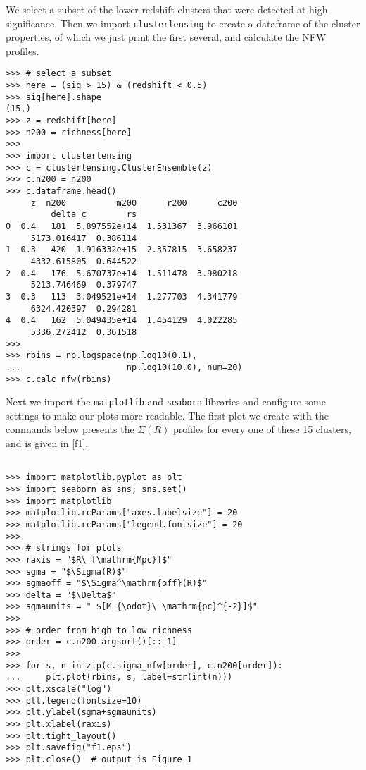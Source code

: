 \documentclass[twocolumn]{aastex6}
\newcommand{\code}{\lstinline[style=codeintext]}
\begin{document}
We select a subset of the lower redshift clusters that were detected at high significance. Then we import \code{clusterlensing} to create a dataframe of the cluster properties, of which we just print the first several, and calculate the NFW profiles.

\begin{verbatim}
>>> # select a subset
>>> here = (sig > 15) & (redshift < 0.5)
>>> sig[here].shape
(15,)
>>> z = redshift[here]
>>> n200 = richness[here]
>>> 
>>> import clusterlensing
>>> c = clusterlensing.ClusterEnsemble(z)
>>> c.n200 = n200
>>> c.dataframe.head()
     z  n200          m200      r200      c200
         delta_c        rs
0  0.4   181  5.897552e+14  1.531367  3.966101
     5173.016417  0.386114
1  0.3   420  1.916332e+15  2.357815  3.658237
     4332.615805  0.644522
2  0.4   176  5.670737e+14  1.511478  3.980218
     5213.746469  0.379747
3  0.3   113  3.049521e+14  1.277703  4.341779
     6324.420397  0.294281
4  0.4   162  5.049435e+14  1.454129  4.022285
     5336.272412  0.361518
>>>
>>> rbins = np.logspace(np.log10(0.1),
...                     np.log10(10.0), num=20)
>>> c.calc_nfw(rbins)
\end{verbatim}
\label{3dmf2df}

Next we import the \code{matplotlib} and \code{seaborn} libraries and configure some settings to make our plots more readable. The first plot we create with the commands below presents the $\Sigma(R)$ profiles for every one of these 15 clusters, and is given in \cref{f1}.
\begin{verbatim}

>>> import matplotlib.pyplot as plt
>>> import seaborn as sns; sns.set()
>>> import matplotlib
>>> matplotlib.rcParams["axes.labelsize"] = 20
>>> matplotlib.rcParams["legend.fontsize"] = 20
>>> 
>>> # strings for plots
>>> raxis = "$R\ [\mathrm{Mpc}]$"
>>> sgma = "$\Sigma(R)$"
>>> sgmaoff = "$\Sigma^\mathrm{off}(R)$"
>>> delta = "$\Delta$"
>>> sgmaunits = " $[M_{\odot}\ \mathrm{pc}^{-2}]$"
>>> 
>>> # order from high to low richness
>>> order = c.n200.argsort()[::-1]
>>> 
>>> for s, n in zip(c.sigma_nfw[order], c.n200[order]):
...     plt.plot(rbins, s, label=str(int(n)))
>>> plt.xscale("log")
>>> plt.legend(fontsize=10)
>>> plt.ylabel(sgma+sgmaunits)
>>> plt.xlabel(raxis)
>>> plt.tight_layout()
>>> plt.savefig("f1.eps")
>>> plt.close()  # output is Figure 1

\end{verbatim}
\end{document}
